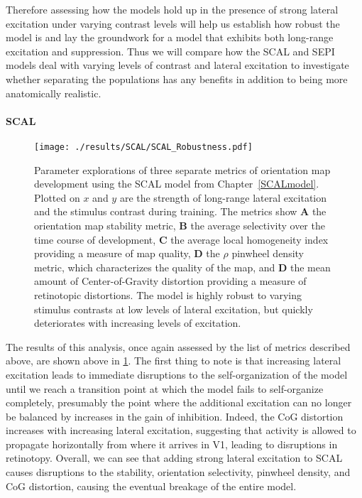 Therefore assessing how the models hold up in the presence of strong
lateral excitation under varying contrast levels will help us
establish how robust the model is and lay the groundwork for a model
that exhibits both long-range excitation and suppression. Thus we will
compare how the SCAL and SEPI models deal with varying levels of
contrast and lateral excitation to investigate whether separating the
populations has any benefits in addition to being more anatomically
realistic.

\paragraph{SCAL}

\begin{figure}
	\centering
        \texttt{[image: ./results/SCAL/SCAL\_Robustness.pdf]}
	\caption{Parameter explorations of three separate metrics of
      orientation map development using the SCAL model from
      Chapter~\ref{SCALmodel}. Plotted on $x$ and $y$ are the strength
      of long-range lateral excitation and the stimulus contrast
      during training. The metrics show \textbf{A} the orientation map
      stability metric, \textbf{B} the average selectivity over the
      time course of development, \textbf{C} the average local
      homogeneity index providing a measure of map quality, \textbf{D}
      the $\rho$ pinwheel density metric, which characterizes the
      quality of the map, and \textbf{D} the mean amount of
      Center-of-Gravity distortion providing a measure of retinotopic
      distortions. The model is highly robust to varying stimulus
      contrasts at low levels of lateral excitation, but quickly
      deteriorates with increasing levels of excitation.}
	\label{SCALStability}
\end{figure}

The results of this analysis, once again assessed by the list of
metrics described above, are shown above in \ref{SCALStability}. The
first thing to note is that increasing lateral excitation leads to
immediate disruptions to the self-organization of the model until we
reach a transition point at which the model fails to self-organize
completely, presumably the point where the additional excitation can
no longer be balanced by increases in the gain of inhibition. Indeed,
the CoG distortion increases with increasing lateral excitation,
suggesting that activity is allowed to propagate horizontally from
where it arrives in V1, leading to disruptions in retinotopy. Overall,
we can see that adding strong lateral excitation to SCAL causes
disruptions to the stability, orientation selectivity, pinwheel
density, and CoG distortion, causing the eventual breakage of the
entire model.

